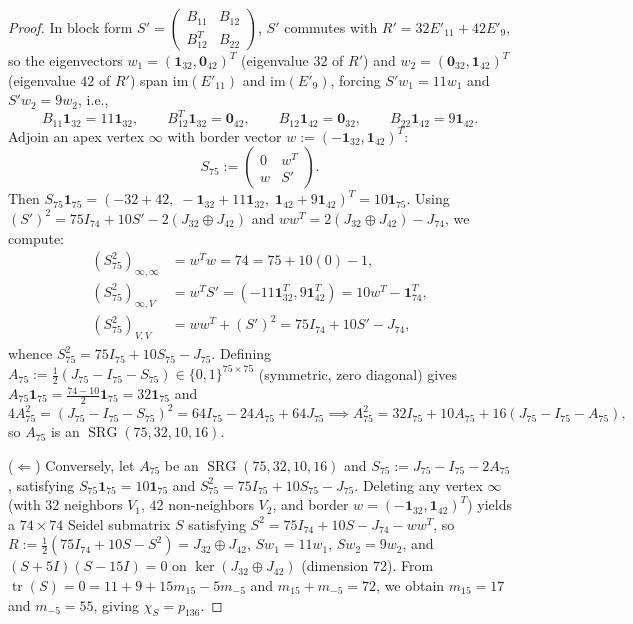 \documentclass[11pt,reqno]{amsart}
\theoremstyle{definition}
\theoremstyle{remark}
\numberwithin{equation}{section}
\numberwithin{table}{section}
\DeclareMathOperator{\tr}{tr}
\DeclareMathOperator{\SRG}{SRG}
\begin{document}
\begin{proof}
In block form $S' = \left(\begin{smallmatrix} B_{11} & B_{12} \\ B_{12}^T & B_{22} \end{smallmatrix}\right)$, $S'$ commutes with $R' = 32 E'_{11} + 42 E'_9$, so the eigenvectors $w_1 = (\mathbf{1}_{32}, \mathbf{0}_{42})^T$ (eigenvalue $32$ of $R'$) and $w_2 = (\mathbf{0}_{32}, \mathbf{1}_{42})^T$ (eigenvalue $42$ of $R'$) span $\mathrm{im}(E'_{11})$ and $\mathrm{im}(E'_9)$, forcing $S' w_1 = 11 w_1$ and $S' w_2 = 9 w_2$, i.e.,
\[
  B_{11}\mathbf{1}_{32} = 11\mathbf{1}_{32}, \qquad B_{12}^T\mathbf{1}_{32} = \mathbf{0}_{42}, \qquad B_{12}\mathbf{1}_{42} = \mathbf{0}_{32}, \qquad B_{22}\mathbf{1}_{42} = 9\mathbf{1}_{42}.
\]
Adjoin an apex vertex $\infty$ with border vector $w := (-\mathbf{1}_{32}, \mathbf{1}_{42})^T$:
\[
  S_{75} := \begin{pmatrix} 0 & w^T \\ w & S' \end{pmatrix}.
\]
Then $S_{75}\mathbf{1}_{75} = (-32 + 42,\; -\mathbf{1}_{32} + 11\mathbf{1}_{32},\; \mathbf{1}_{42} + 9\mathbf{1}_{42})^T = 10\mathbf{1}_{75}$. Using $(S')^2 = 75I_{74} + 10S' - 2(J_{32} \oplus J_{42})$ and $w w^T = 2(J_{32} \oplus J_{42}) - J_{74}$, we compute:
\begin{align*}
  (S_{75}^2)_{\infty, \infty} &= w^T w = 74 = 75 + 10(0) - 1, \\
  (S_{75}^2)_{\infty, V} &= w^T S' = (-11\mathbf{1}_{32}^T, 9\mathbf{1}_{42}^T) = 10 w^T - \mathbf{1}_{74}^T, \\
  (S_{75}^2)_{V, V} &= w w^T + (S')^2 = 75I_{74} + 10S' - J_{74},
\end{align*}
whence $S_{75}^2 = 75I_{75} + 10S_{75} - J_{75}$. Defining $A_{75} := \frac{1}{2}(J_{75} - I_{75} - S_{75}) \in \{0, 1\}^{75 \times 75}$ (symmetric, zero diagonal) gives $A_{75}\mathbf{1}_{75} = \frac{74 - 10}{2}\mathbf{1}_{75} = 32\mathbf{1}_{75}$ and
\[
  4A_{75}^2 = (J_{75} - I_{75} - S_{75})^2 = 64I_{75} - 24A_{75} + 64J_{75} \implies A_{75}^2 = 32I_{75} + 10A_{75} + 16(J_{75} - I_{75} - A_{75}),
\]
so $A_{75}$ is an $\SRG(75, 32, 10, 16)$.

($\Leftarrow$) Conversely, let $A_{75}$ be an $\SRG(75, 32, 10, 16)$ and $S_{75} := J_{75} - I_{75} - 2A_{75}$, satisfying $S_{75}\mathbf{1}_{75} = 10\mathbf{1}_{75}$ and $S_{75}^2 = 75I_{75} + 10S_{75} - J_{75}$. Deleting any vertex $\infty$ (with $32$ neighbors $V_1$, $42$ non-neighbors $V_2$, and border $w = (-\mathbf{1}_{32}, \mathbf{1}_{42})^T$) yields a $74 \times 74$ Seidel submatrix $S$ satisfying $S^2 = 75I_{74} + 10S - J_{74} - w w^T$, so $R := \frac{1}{2}(75I_{74} + 10S - S^2) = J_{32} \oplus J_{42}$, $Sw_1 = 11w_1$, $Sw_2 = 9w_2$, and $(S + 5I)(S - 15I) = 0$ on $\ker(J_{32} \oplus J_{42})$ (dimension $72$). From $\tr(S) = 0 = 11 + 9 + 15m_{15} - 5m_{-5}$ and $m_{15} + m_{-5} = 72$, we obtain $m_{15} = 17$ and $m_{-5} = 55$, giving $\chi_S = p_{136}$.
\end{proof}
\end{document}
